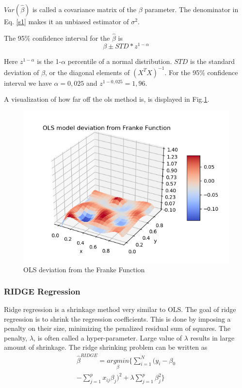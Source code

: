 \documentclass[a4paper,11pt,twocolumn]{article}
\begin{document}
$Var(\hat{\beta})$ is called a covariance matrix of the $\beta$ parameter. The denominator in Eq. \eqref{s1} makes it an unbiased estimator of $\sigma^2$. 

The 95\% confidence interval for the $\hat{\beta}$ is 
\begin{equation}
\beta\pm STD*z^{1-\alpha}
\end{equation}


Here $z^{1-\alpha}$ is the 1-$\alpha$ percentile of a normal distribution. $STD$ is the standard deviation of $\beta$, or the diagonal elements of $(X^TX)^{-1}$. For the 95\% confidence interval we have $\alpha =0,025$ and $z^{1-0,025}=1,96$\cite{Hastie}.  

A visualization of how far off the ols method is, is displayed in Fig.\ref{olsdeviation}.
\begin{figure}[h]
\centering
\includegraphics[scale=0.75]{olsdeviation}
\caption{OLS deviation from the Franke Function}
\label{olsdeviation}
\end{figure}

\subsubsection{RIDGE Regression}

Ridge regression is a shrinkage method very similar to OLS. The goal of ridge regression is to shrink the regression coefficients. This is done by imposing a penalty on their size, minimizing the penalized residual sum of squares. The penalty, $\lambda$, is often called a hyper-parameter. Large value of $\lambda$ results in large amount of shrinkage. The ridge shrinking problem can be written as
\begin{equation}
\begin{multlined}
\hat{\beta}^{RIDGE}=\underset{\beta}{argmin}\lbrace\sum\limits_{i=1}^N(y_i-\beta_0\\-\sum\limits_{j=1}^px_{ij}\beta_j)^2+\lambda\sum\limits_{j=1}^p\beta_j^2\rbrace
\end{multlined}
\end{equation}
\end{document}
